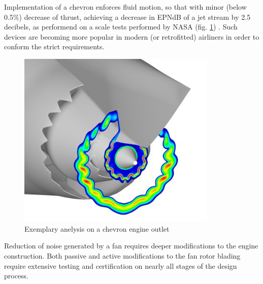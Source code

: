 Implementation of a chevron enforces fluid motion, so that with minor (below 0.5\%) decrease of thrust, achieving a decrease in EPNdB of a jet stream by 2.5 decibels, as performend on a scale tests performed by NASA (fig. \ref{chevron2}) \citep{methods}. Such devices are becoming more popular in modern (or retrofitted) airliners in order to conform the strict requirements.

\begin{figure}[h!]
\centering %
\includegraphics[width=0.85\textwidth]{Pictures/chevron2.jpg}
\caption{Exemplary anelysis on a chevron engine outlet \citep{methods}}
\label{chevron2}
\end{figure}

Reduction of noise generated by a fan requires deeper modifications to the engine construction. Both passive and active modifications to the fan rotor blading require extensive testing and certification on nearly all stages of the design process. 